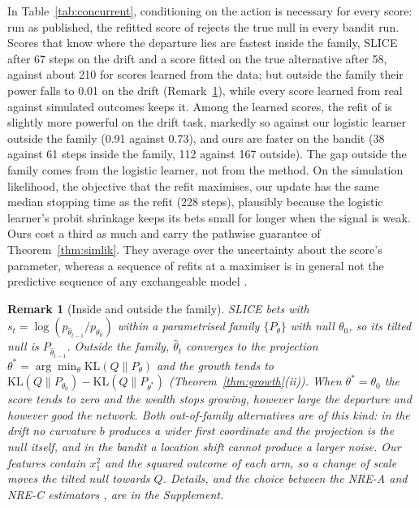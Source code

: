 \documentclass[pdflatex,sn-mathphys-ay]{sn-jnl}
\newcommand{\KL}{\mathrm{KL}}
\theoremstyle{thmstyleone}
\theoremstyle{thmstyletwo}
\newtheorem{remark}{Remark}
\begin{document}
In Table~\ref{tab:concurrent}, conditioning on the action is necessary for
every score: run as published, the refitted score of
\citet{forre2026anytime} rejects the true null in every bandit run. Scores
that know where the departure lies are fastest inside the family, SLICE after
67 steps on the drift and a score fitted on the true alternative after 58,
against about 210 for scores learned from the data; but outside the family
their power falls to 0.01 on the drift (Remark~\ref{rem:family}), while every
score learned from real against simulated outcomes keeps it. Among the learned
scores, the refit of \citet{forre2026anytime} is slightly more powerful on the
drift task, markedly so against our logistic learner outside the family (0.91
against 0.73), and ours are faster on the bandit (38 against 61 steps inside
the family, 112 against 167 outside). The gap outside the family comes from
the logistic learner, not from the method. On the simulation likelihood, the
objective that the refit maximises, our update has the same median stopping
time as the refit (228 steps), plausibly because the logistic learner's probit
shrinkage keeps its bets small for longer when the signal is weak. Ours cost a
third as much and carry the pathwise guarantee of Theorem~\ref{thm:simlik}.
They average over the uncertainty about the score's parameter, whereas a sequence of refits at a maximiser is in general not the
predictive sequence of any exchangeable model
\citep{fortini2000exchangeability,fortini2024exchangeability}.

\begin{remark}[Inside and outside the family]\label{rem:family}
SLICE bets with $s_t = \log (p_{\hat\theta_{t-1}}/p_{\theta_0})$ within a
parametrised family $\{P_\theta\}$ with null $\theta_0$, so its tilted null is
$P_{\hat\theta_{t-1}}$. Outside the family, $\hat\theta_t$ converges to the
projection $\theta^* = \arg\min_\theta \KL(Q\|P_\theta)$ and the growth tends to
$\KL(Q\|P_{\theta_0}) - \KL(Q\|P_{\theta^*})$ (Theorem~\ref{thm:growth}(ii)).
When $\theta^* = \theta_0$ the score tends to zero and the wealth stops
growing, however large the departure and however good the network. Both
out-of-family alternatives are of this kind: in the drift no curvature $b$
produces a wider first coordinate and the projection is the null itself, and
in the bandit a location shift cannot produce a larger noise. Our features
contain $x_1^2$ and the squared outcome of each arm, so a change of scale moves
the tilted null towards $Q$. Details, and the choice between the NRE-A and
NRE-C estimators \citep{miller2022contrastive}, are in the Supplement.
\end{remark}
\end{document}
